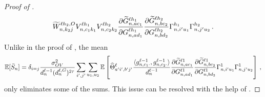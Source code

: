 \begin{proof}[Proof of ]
\begin{align*}
            \widetilde{W}_{n , k_2 j}^{\ell h_2 , O}
            V_{n, c_1 k_1}^{\ell h_1}
            V_{n, c_2 k_2}^{\ell h_2}
            \frac{
                \partial
                \widetilde{G}_{n, a c_1}^{\ell h_1}
            }{
                \partial 
                G_{n, a d_1}^{\ell h_1}
            }
            \frac{
                \partial
                \widetilde{G}_{n, b c_2}^{\ell h_2}
            }{
                \partial 
                G_{n, b d_2}^{\ell h_2}
            }
            \Gamma_{n, i' u_1}^{h_1}
            \Gamma_{n, j' u_2}^{h_2}
        \, .
    \end{align*}
    Unlike in the proof of , the mean 
    \begin{align}\label{eq:vv_mean}
        \operatorname*{\mathbb{E}} [
            \bar{S}_{n}
        ]
        =
        \delta_{i = j}
        \frac{\sigma_{O V}^2}{d_{n}^{\ell - 1} (d_{n}^{\ell, G})^{2\tau}}
        \sum_{i', j'}
        \sum_{\substack{u_1 , u_2}}
            \operatorname*{\mathbb{E}} \left[
                \widehat{\Theta}_{
                    a' i' , b' j'
                }^{\ell}
                \frac{
                    \langle
                        g_{n, c_1 \cdot}^{\ell - 1}
                        ,
                        g_{n, c_2 \cdot}^{\ell - 1}
                    \rangle
                }{
                    d_{n}^{\ell - 1}
                }
                \frac{
                    \partial
                    \widetilde{G}_{n, a c_1}^{\ell 1}
                }{
                    \partial 
                    G_{n, a d_1}^{\ell 1}
                }
                \frac{
                    \partial
                    \widetilde{G}_{n, b c_2}^{\ell 1}
                }{
                    \partial 
                    G_{n, b d_2}^{\ell 1}
                }
                \Gamma_{n, i' u_1}^{1}
                \Gamma_{n, j' u_2}^{1}
            \right]
        \, ,
    \end{align}
    only eliminates some of the sums.
    This issue can be resolved with the help of .
    

\end{proof}
